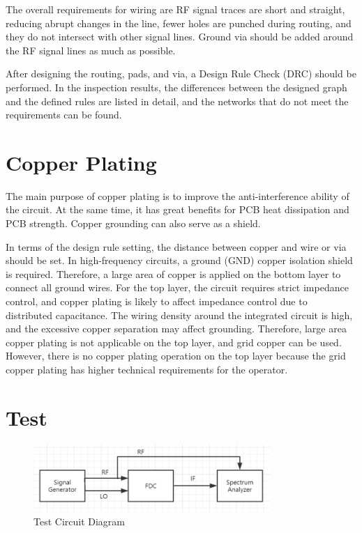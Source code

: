 \documentclass[12pt, a4paper]{report}
\begin{document}
The overall requirements for wiring are RF signal traces are short and straight, reducing abrupt changes in the line, fewer holes are punched during routing, and they do not intersect with other signal lines. Ground via should be added around the RF signal lines as much as possible.

After designing the routing, pads, and via, a Design Rule Check (DRC) should be performed. In the inspection results, the differences between the designed graph and the defined rules are listed in detail, and the networks that do not meet the requirements can be found.


\section{Copper Plating}

The main purpose of copper plating is to improve the anti-interference ability of the circuit. At the same time, it has great benefits for PCB heat dissipation and PCB strength. Copper grounding can also serve as a shield.

In terms of the design rule setting, the distance between copper and wire or via should be set. In high-frequency circuits, a ground (GND) copper isolation shield is required. Therefore, a large area of copper is applied on the bottom layer to connect all ground wires. For the top layer, the circuit requires strict impedance control, and copper plating is likely to affect impedance control due to distributed capacitance. The wiring density around the integrated circuit is high, and the excessive copper separation may affect grounding. Therefore, large area copper plating is not applicable on the top layer, and grid copper can be used. However, there is no copper plating operation on the top layer because the grid copper plating has higher technical requirements for the operator.




\section{Test}


\begin{figure}[htbp]     \begin{centering}
    \includegraphics[width=0.8\textwidth]{img/test.png}
    \caption{\label{Fig:test}Test Circuit Diagram}
    \end{centering}
    
\end{figure}
\end{document}
